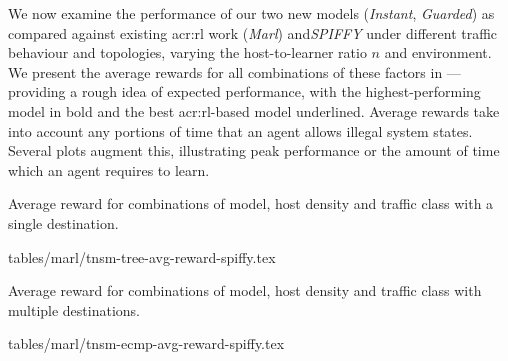 We now examine the performance of our two new models (\emph{Instant}, \emph{Guarded}) as compared against existing \gls{acr:rl} work (\emph{Marl}) and\emph{SPIFFY} under different traffic behaviour and topologies, varying the host-to-learner ratio $n$ and environment.
We present the average rewards for all combinations of these factors in ---providing a rough idea of expected performance, with the highest-performing model in bold and the best \gls{acr:rl}-based model underlined.
Average rewards take into account any portions of time that an agent allows illegal system states.
Several plots augment this, illustrating peak performance or the amount of time which an agent requires to learn.

\begin{table}
	\centering
	\caption{Average reward for combinations of model, host density and traffic class with a single destination.\label{tab:av-vals}}
	
		\expandableinput tables/marl/tnsm-tree-avg-reward-spiffy.tex
\end{table}
\begin{table}
	\centering
	\caption{Average reward for combinations of model, host density and traffic class with multiple destinations.\label{tab:av-ecmp-vals}}
	
		\expandableinput tables/marl/tnsm-ecmp-avg-reward-spiffy.tex
\end{table}

